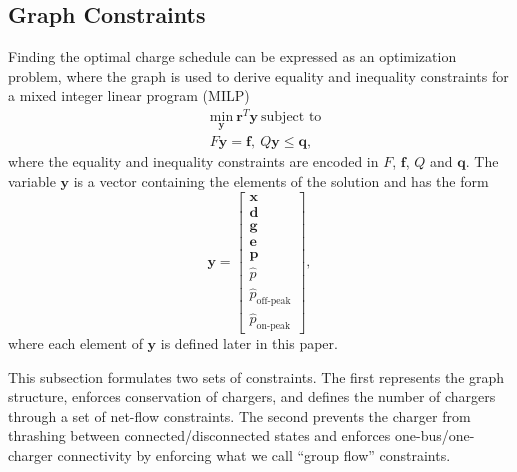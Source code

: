 \subsection{Graph Constraints}
\par Finding the optimal charge schedule can be expressed as an optimization problem, where the graph is used to derive equality and inequality constraints for a mixed integer linear program (MILP)
\begin{equation}
	\begin{aligned}
		& \underset{\mathbf{y}}{\text{min}}\ \mathbf{r}^T\mathbf{y} \ \text{subject to} \\
		& F\mathbf{y} = \mathbf{f}, \ Q\mathbf{y} \le \mathbf{q},
	\end{aligned}
\end{equation}
where the equality and inequality constraints are encoded in $F$, $\mathbf{f}$, $Q$ and $\mathbf{q}$. The variable $\mathbf{y}$ is a vector containing the elements of the solution and has the form 
\begin{equation}\label{eqn:y}
		\mathbf{y} = \begin{bmatrix}
		\mathbf{x} \\
		\mathbf{d} \\
		\mathbf{g} \\
		\mathbf{e} \\
		\mathbf{p} \\
		\hat{p} \\
		\hat{p}_\text{off-peak} \\
		\hat{p}_\text{on-peak} 
	\end{bmatrix},
\end{equation}
where each element of $\mathbf{y}$ is defined later in this paper.
\par  This subsection formulates two sets of constraints.  The first represents the graph structure, enforces conservation of chargers, and defines the number of chargers through a set of net-flow constraints. The second prevents the charger from thrashing between connected/disconnected states and enforces one-bus/one-charger connectivity by enforcing what we call ``group flow'' constraints.
